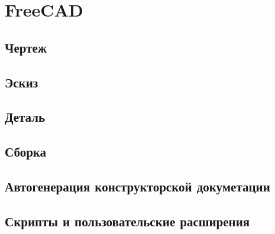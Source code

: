 \chapter{FreeCAD}

\section{Чертеж}

\section{Эскиз}

\section{Деталь}

\section{Сборка}

\section{Автогенерация конструкторской докуметации}

\section{Скрипты и пользовательские расширения}

